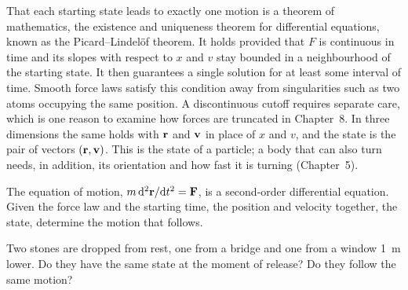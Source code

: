 That each starting state leads to exactly one motion is a theorem of
mathematics, the existence and uniqueness theorem for differential
equations, known as the Picard--Lindel\"of theorem. It holds provided
that $F$ is continuous in time and its slopes with respect to $x$ and
$v$ stay bounded in a neighbourhood of the starting state. It then
guarantees a single solution for at least some interval of time. Smooth
force laws satisfy this condition away from singularities such as two
atoms occupying the same position. A discontinuous cutoff requires
separate care, which is one reason to examine how forces are truncated
in Chapter~8. In three dimensions the same holds
with $\bm{\mathrm{r}}$ and $\bm{\mathrm{v}}$ in place of $x$ and $v$, and the state is the
pair of vectors $(\bm{\mathrm{r}}, \bm{\mathrm{v}})$. This is the state of a particle; a
body that can also turn needs, in addition, its orientation and how fast
it is turning (Chapter~5).

\begin{keyidea}
The equation of motion, $m\,\mathrm{d}^2\bm{\mathrm{r}}/\mathrm{d} t^2 = \bm{\mathrm{F}}$, is a
second-order differential equation. Given the force law and the starting
time, the position and velocity together, the state, determine the
motion that follows.
\end{keyidea}

\begin{selfcheck}
Two stones are dropped from rest, one from a bridge and one from a
window \SI{1}{\metre} lower. Do they have the same state at the moment of
release? Do they follow the same motion?
\end{selfcheck}
